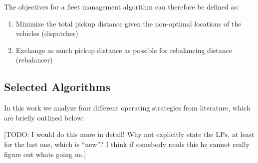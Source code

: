 The objectives for a fleet management algorithm can therefore be defined as:

\begin{enumerate}
\item Minimize the total pickup distance given the non-optimal locations of the vehicles (dispatcher)
\item Exchange as much pickup distance as possible for rebalancing distance (rebalancer)
\end{enumerate}

\subsection{Selected Algorithms}

In this work we analyze four different operating strategies from literature, which are briefly outlined below:

[TODO: I would do this more in detail! Why not explicitly state the LPs, at least for the last one, which is ``new''? I think if somebody reads this he cannot really figure out whats going on.]

